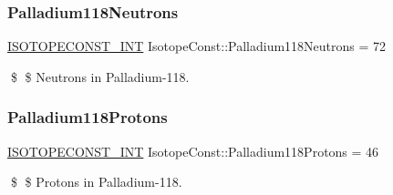 \subsubsection{\texorpdfstring{Palladium118\+Neutrons}{Palladium118Neutrons}}
{\footnotesize\ttfamily \mbox{\hyperlink{group___isotope_const-_macros_ga5f18360b3e99483a35c32d789e62621c}{I\+S\+O\+T\+O\+P\+E\+C\+O\+N\+S\+T\+\_\+\+I\+NT}} Isotope\+Const\+::\+Palladium118\+Neutrons = 72}

\$ \$ Neutrons in Palladium-\/118. \mbox{\label{group___isotope_const-_palladium-_pd118_gad9a65e377ca59c6a1a2acfff2982f5be}} 
\subsubsection{\texorpdfstring{Palladium118\+Protons}{Palladium118Protons}}
{\footnotesize\ttfamily \mbox{\hyperlink{group___isotope_const-_macros_ga5f18360b3e99483a35c32d789e62621c}{I\+S\+O\+T\+O\+P\+E\+C\+O\+N\+S\+T\+\_\+\+I\+NT}} Isotope\+Const\+::\+Palladium118\+Protons = 46}

\$ \$ Protons in Palladium-\/118. 